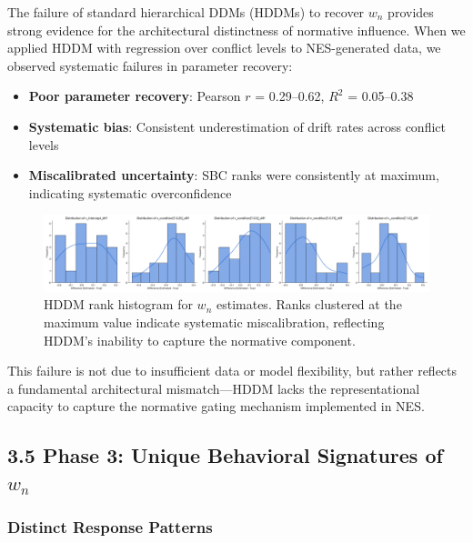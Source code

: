 \documentclass[
  11pt,
]{article}
\providecommand{\tightlist}{%
  \setlength{\itemsep}{0pt}\setlength{\parskip}{0pt}}
\begin{document}
The failure of standard hierarchical DDMs (HDDMs) to recover \(w_n\)
provides strong evidence for the architectural distinctness of normative
influence. When we applied HDDM with regression over conflict levels to
NES-generated data, we observed systematic failures in parameter
recovery:

\begin{itemize}
\tightlist
\item
  \textbf{Poor parameter recovery}: Pearson \(r\) = 0.29--0.62, \(R^2\)
  = 0.05--0.38
\item
  \textbf{Systematic bias}: Consistent underestimation of drift rates
  across conflict levels
\item
  \textbf{Miscalibrated uncertainty}: SBC ranks were consistently at
  maximum, indicating systematic overconfidence
\end{itemize}

\begin{figure}
\centering
\includegraphics[width=0.8\linewidth,height=\textheight,keepaspectratio]{figures/fortified_hddm_histogram.png}
\caption{HDDM rank histogram for \(w_n\) estimates. Ranks clustered at
the maximum value indicate systematic miscalibration, reflecting HDDM's
inability to capture the normative component.}\label{fig:hddm_hist}
\end{figure}

This failure is not due to insufficient data or model flexibility, but
rather reflects a fundamental architectural mismatch---HDDM lacks the
representational capacity to capture the normative gating mechanism
implemented in NES.

\subsection{\texorpdfstring{3.5 Phase 3: Unique Behavioral Signatures of
\(w_n\)}{3.5 Phase 3: Unique Behavioral Signatures of w\_n}}\label{phase-3-unique-behavioral-signatures-of-w_n}

\subsubsection{Distinct Response
Patterns}\label{distinct-response-patterns}
\end{document}
